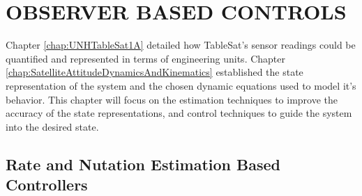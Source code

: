 
\chapter{OBSERVER BASED CONTROLS}
\label{chap:ObserverBasedControls}

Chapter \ref{chap:UNHTableSat1A} detailed how TableSat's sensor readings could be quantified and represented in terms of engineering units.  Chapter \ref{chap:SatelliteAttitudeDynamicsAndKinematics} established the state representation of the system and the chosen dynamic equations used to model it's behavior.  This chapter will focus on the estimation techniques to improve the accuracy of the state representations, and control techniques to guide the system into the desired state.

\section{Rate and Nutation Estimation Based Controllers}
\label{sec:RateandNutationEstimationBasedControllers}

